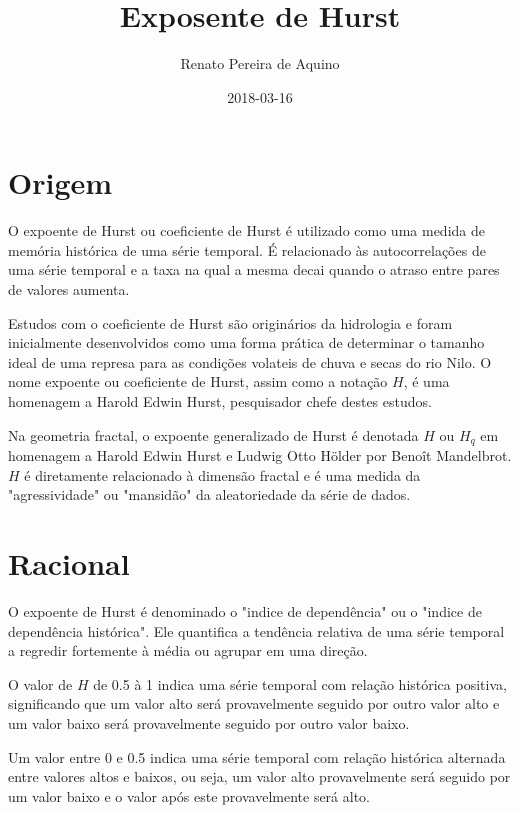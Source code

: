\documentclass[11pt]{book}
\begin{document}
\title{Exposente de Hurst}
\author{Renato Pereira de Aquino}
\date{2018-03-16}
\maketitle
\tableofcontents

\chapter{Origem}

O expoente de Hurst ou coeficiente de Hurst é utilizado como uma medida de memória histórica de uma série temporal. É relacionado às autocorrelações de uma série temporal e a taxa na qual a mesma decai quando o atraso entre pares de valores aumenta. 

Estudos com o coeficiente de Hurst são originários da hidrologia e foram inicialmente desenvolvidos como uma forma prática de determinar o tamanho ideal de uma represa para as condições volateis de chuva e secas do rio Nilo. O nome expoente ou coeficiente de Hurst, assim como a notação $ H $, é uma homenagem a Harold Edwin Hurst, pesquisador chefe destes estudos\cite{hurst}.

Na geometria fractal, o expoente generalizado de Hurst é denotada $ H $ ou $ H_q $ em homenagem a Harold Edwin Hurst e Ludwig Otto Hölder por Benoît Mandelbrot\cite{mandelbrot}. $ H $ é diretamente relacionado à dimensão fractal e é uma medida da "agressividade" ou "mansidão" da aleatoriedade da série de dados.


\chapter{Racional}

O expoente de Hurst é denominado o "indice de dependência" ou o "indice de dependência histórica". Ele quantifica a tendência relativa de uma série temporal a regredir fortemente à média ou agrupar em uma direção. 

O valor de $H$ de 0.5 à 1 indica uma série temporal com relação histórica positiva, significando que um valor alto será provavelmente seguido por outro valor alto e um valor baixo será provavelmente seguido por outro valor baixo. 

Um valor entre 0 e 0.5 indica uma série temporal com relação histórica alternada entre valores altos e baixos, ou seja, um valor alto provavelmente será seguido por um valor baixo e o valor após este provavelmente será alto. 
\end{document}
